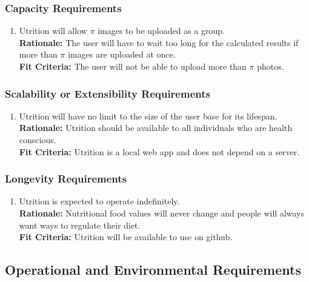 \documentclass[12pt]{article}
\begin{document}
\subsubsection{Capacity Requirements}

\begin{enumerate}[{PR}7. ] 
	\item Utrition will allow $\pi$ images to be uploaded as a group.\\
	\textbf{Rationale:} The user will have to wait too long for the calculated results if more than $\pi$ images are uploaded at once. \\
	\textbf{Fit Criteria:} The user will not be able to upload more than $\pi$ photos.
\end{enumerate}

\subsubsection{Scalability or Extensibility Requirements}

\begin{enumerate}[{PR}8. ] 
	\item Utrition will have no limit to the size of the user base for its lifespan. \\
	\textbf{Rationale:} Utrition should be available to all individuals who are health conscious.\\
	\textbf{Fit Criteria:} Utrition is a local web app and does not depend on a server.
\end{enumerate}

\subsubsection{Longevity Requirements}

\begin{enumerate}[{PR}9. ] 
	\item Utrition is expected to operate indefinitely.\\
	\textbf{Rationale:} Nutritional food values will never change and people will always want ways to regulate their diet. \\
	\textbf{Fit Criteria:} Utrition will be available to use on github.
\end{enumerate}

\subsection{Operational and Environmental Requirements}
\end{document}

